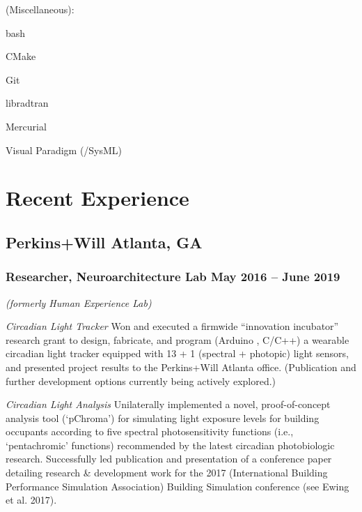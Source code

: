 \documentclass[letterpaper, oneside, 10pt]{article}
\begin{document}
\begin{multicols}{2}
{  {\jostmedium (Miscellaneous):}%
    \begin{itemize*}[%
      label=\relax, labelwidth=0pt, itemjoin=\space\char"00B7%
    ]%
      \item bash%
      \item CMake%
      \item Git%
      \item {}%
      \item libradtran%
      \item Mercurial%
      \item {}%
      \item Visual Paradigm (/SysML)%
    \end{itemize*}
  }
\end{multicols}

\section*{Recent Experience} %

\hfill
\vspace{-24pt}

\subsection*{Perkins+Will\DotSep{0.25em} Atlanta, GA}
\subsubsection*{Researcher, Neuroarchitecture Lab\DotSep{0.25em} May 2016 -- June 2019}

%
\DotSep{0.25em} \textit{(formerly Human Experience Lab)}%


\textit{Circadian Light Tracker}\DotSep{0.25em}
Won and executed a firmwide ``innovation incubator'' research grant to
design, fabricate, and program (Arduino , C/C++) a
wearable circadian light tracker equipped with 13 + 1 (spectral +
photopic) light sensors, and presented project results to the Perkins+Will
Atlanta office. (Publication and further development options currently
being actively explored.)

\textit{Circadian Light Analysis}\DotSep{0.25em}
Unilaterally implemented a novel, proof-of-concept analysis tool
(`pChroma') for simulating light exposure levels for building occupants
according to five spectral photosensitivity functions (i.e., `pentachromic'
functions) recommended by the latest circadian photobiologic research.
Successfully led publication and presentation of a conference paper
detailing research \& development work for the 2017 
(International Building Performance Simulation Association) Building
Simulation conference (see Ewing et al. 2017).
\end{document}
